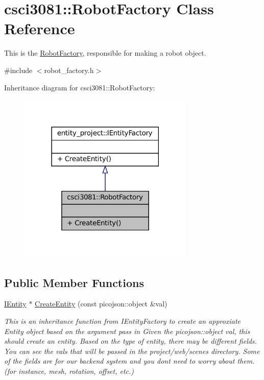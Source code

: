 \hypertarget{classcsci3081_1_1RobotFactory}{}\section{csci3081\+:\+:Robot\+Factory Class Reference}
\label{classcsci3081_1_1RobotFactory}


This is the \hyperlink{classcsci3081_1_1RobotFactory}{Robot\+Factory}, responsible for making a robot object.  




{\ttfamily \#include $<$robot\+\_\+factory.\+h$>$}



Inheritance diagram for csci3081\+:\+:Robot\+Factory\+:
\nopagebreak
\begin{figure}[H]
\begin{center}
\leavevmode
\includegraphics[width=237pt]{classcsci3081_1_1RobotFactory__inherit__graph}
\end{center}
\end{figure}
\subsection*{Public Member Functions}
\begin{DoxyCompactItemize}
\item 
\hyperlink{classentity__project_1_1IEntity}{I\+Entity} $\ast$ \hyperlink{classcsci3081_1_1RobotFactory_a5775ecc230c01ae455284cd04f491129}{Create\+Entity} (const picojson\+::object \&val)
\begin{DoxyCompactList}\small\item\em This is an inheritance function from I\+Entity\+Factory to create an approxiate Entity object based on the argument pass in Given the picojson\+::object val, this should create an entity. Based on the type of entity, there may be different fields. You can see the vals that will be passed in the project/web/scenes directory. Some of the fields are for our backend system and you don\textquotesingle{}t need to worry about them. (for instance, mesh, rotation, offset, etc.) \end{DoxyCompactList}\end{DoxyCompactItemize}


